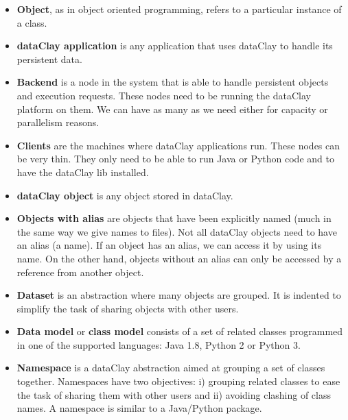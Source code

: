 \begin{itemize}

\item {\bf Object}, as in object oriented programming, refers to a particular instance of a class.

\item {\bf dataClay application} is any application that uses dataClay to handle its persistent data. 

\item {\bf Backend} is a node in the system that is able to handle persistent objects and execution requests. These nodes need to be running the dataClay platform on them. We can have as many as we need either for capacity or parallelism reasons.

\item {\bf Clients} are the machines where dataClay applications run. These nodes can be very thin. They only need to be able to run Java or Python code and to have the dataClay lib installed.

\item {\bf dataClay object} is any object stored in dataClay.

\item {\bf Objects with alias} are objects that have been explicitly named (much in the same way we give names to files). Not all dataClay objects need to have an alias (a name). If an object has an alias, we can access it by using its name. On the other hand, objects without an alias can only be accessed by a reference from another object. 

\item {\bf Dataset} is an abstraction where many objects are grouped. It is indented to simplify the task of sharing objects with other users.

\item {\bf Data model} or \textbf{class model} consists of a set of related classes programmed in one of the supported languages: Java 1.8, Python 2 or Python 3.

\item {\bf Namespace}  is a dataClay abstraction aimed at grouping a set of classes together. Namespaces have two objectives: i) grouping related classes to ease the task of sharing them with other users and ii) avoiding clashing of class names. A namespace is similar to a Java/Python package.

\end{itemize}

